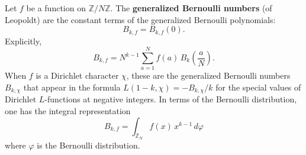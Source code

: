 Let $f$ be a function on $\mathbb{Z}/N\mathbb{Z}$. The \textbf{generalized Bernoulli numbers} (of Leopoldt) are the constant terms of the generalized Bernoulli polynomials:
$$B_{k,f} = B_{k,f}(0).$$
Explicitly,
$$B_{k,f} = N^{k-1} \sum_{a=1}^{N} f(a) \, B_k\!\left(\frac{a}{N}\right).$$
When $f$ is a Dirichlet character $\chi$, these are the generalized Bernoulli numbers $B_{k,\chi}$ that appear in the formula $L(1-k, \chi) = -B_{k,\chi}/k$ for the special values of Dirichlet $L$-functions at negative integers. In terms of the Bernoulli distribution, one has the integral representation
$$B_{k,f} = \int_{\mathbb{Z}_N} f(x) \, x^{k-1} \, d\varphi$$
where $\varphi$ is the Bernoulli distribution.
